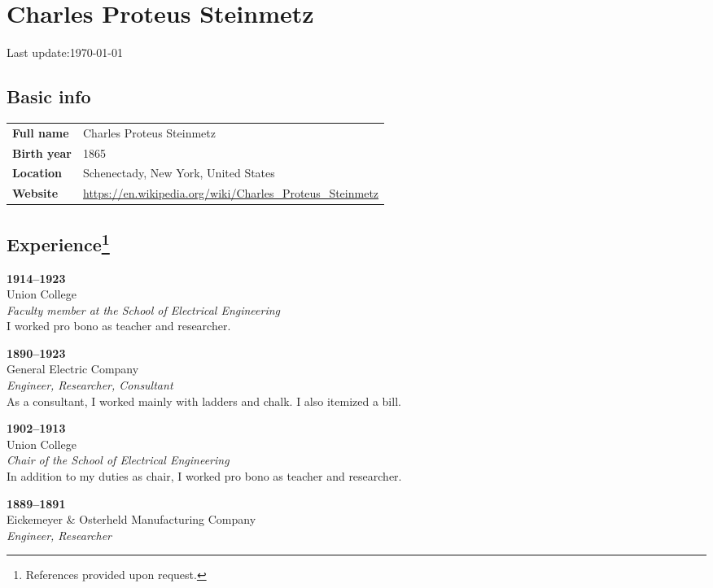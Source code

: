 \documentclass[a4paper]{article}
\newlength{\LASTUPDATESEP}\setlength{\LASTUPDATESEP}{1em}
\begin{document}
\section*{Charles Proteus Steinmetz}
\vspace{\LASTUPDATESEP}
Last update:\@ \today{}%
\vspace{\LASTUPDATESEP}
\subsection*{Basic info}
%
\begin{tabularx}{\textwidth}{@{}lX}
     \textbf{Full name}  & Charles Proteus Steinmetz
  \\ \textbf{Birth year} & 1865
  \\ \textbf{Location}   & Schenectady, New York, United States
  \\ \textbf{Website}    & \url{https://en.wikipedia.org/wiki/Charles_Proteus_Steinmetz}
\end{tabularx}
\subsection*{Experience\footnote{References provided upon request.}}
\textbf{1914--1923}                                             \\
Union College                                                   \\
\textit{Faculty member at the School of Electrical Engineering} \\
I worked pro bono as teacher and researcher.
\par
\textbf{1890--1923}                       \\
General Electric Company                  \\
\textit{Engineer, Researcher, Consultant} \\
As a consultant, I worked mainly with ladders and chalk. I also itemized a bill.
\par
\textbf{1902--1913}                                    \\
Union College                                          \\
\textit{Chair of the School of Electrical Engineering} \\
In addition to my duties as chair, I worked pro bono as teacher and researcher.
\par
\textbf{1889--1891}                           \\
Eickemeyer \& Osterheld Manufacturing Company \\
\textit{Engineer, Researcher}
\end{document}
